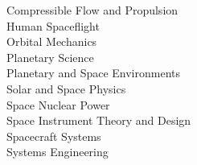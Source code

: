 Compressible Flow and Propulsion\\
Human Spaceflight\\
Orbital Mechanics\\
Planetary Science\\
Planetary and Space Environments\\
Solar and Space Physics\\
Space Nuclear Power \\
Space Instrument Theory and Design\\
Spacecraft Systems\\
Systems Engineering\\

